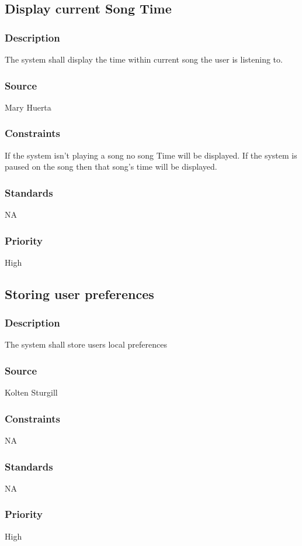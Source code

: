 \subsection{Display current Song Time}
\subsubsection{Description}
The system shall display the time within current song the user is listening to.
\subsubsection{Source}
Mary Huerta
\subsubsection{Constraints}
If the system isn't playing a song no song Time will be displayed. If the system is paused on the song then that song's time will be displayed. 
\subsubsection{Standards}
NA
\subsubsection{Priority}
High



\subsection{Storing user preferences}
\subsubsection{Description}
The system shall store users local preferences
\subsubsection{Source}
Kolten Sturgill
\subsubsection{Constraints}
NA
\subsubsection{Standards}
NA
\subsubsection{Priority}
High



